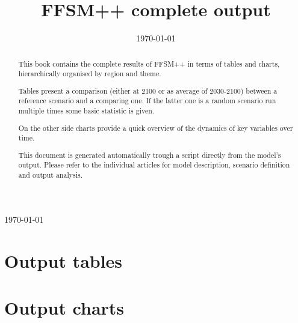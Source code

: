 \documentclass[a4paper,11pt]{paper}
\title{FFSM++ complete output}
\date{\today}
\begin{document}
\maketitle
\today

\begin{abstract}
This book contains the complete results of FFSM++ in terms of tables and charts, hierarchically organised by region and theme.

Tables present a comparison (either at 2100 or as average of 2030-2100) between a reference scenario and a comparing one. If the latter one is a random scenario run multiple times some basic statistic is given.

On the other side charts provide a quick overview of the dynamics of key variables over time.

This document is generated automatically trough a script directly from the model's output. Please refer to the individual articles for model description, scenario definition and output analysis.

\end{abstract}

\thispagestyle{empty}
\newpage
\tableofcontents
\thispagestyle{empty}
\newpage
\part[Tables]{Output tables}

\clearpage
\newpage
\part[Charts]{Output charts}



%
\end{document}
